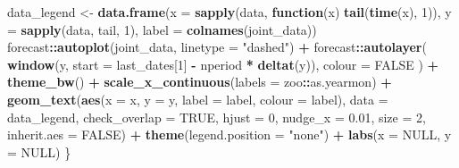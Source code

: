 \documentclass[
  12pt,
  a4paper,french]{article}
\newenvironment{Shaded}{\begin{snugshade}}{\end{snugshade}}
\newcommand{\AttributeTok}[1]{\textcolor[rgb]{0.13,0.29,0.53}{#1}}
\newcommand{\ConstantTok}[1]{\textcolor[rgb]{0.56,0.35,0.01}{#1}}
\newcommand{\ControlFlowTok}[1]{\textcolor[rgb]{0.13,0.29,0.53}{\textbf{#1}}}
\newcommand{\DecValTok}[1]{\textcolor[rgb]{0.00,0.00,0.81}{#1}}
\newcommand{\FloatTok}[1]{\textcolor[rgb]{0.00,0.00,0.81}{#1}}
\newcommand{\FunctionTok}[1]{\textcolor[rgb]{0.13,0.29,0.53}{\textbf{#1}}}
\newcommand{\NormalTok}[1]{#1}
\newcommand{\OtherTok}[1]{\textcolor[rgb]{0.56,0.35,0.01}{#1}}
\newcommand{\SpecialCharTok}[1]{\textcolor[rgb]{0.81,0.36,0.00}{\textbf{#1}}}
\newcommand{\StringTok}[1]{\textcolor[rgb]{0.31,0.60,0.02}{#1}}
\newcommand\1{\mathds{1}}
\begin{document}
\begin{Shaded}
\begin{Highlighting}[]
\NormalTok{  data\_legend }\OtherTok{\textless{}{-}} 
    \FunctionTok{data.frame}\NormalTok{(}\AttributeTok{x =} \FunctionTok{sapply}\NormalTok{(data, }\ControlFlowTok{function}\NormalTok{(x) }\FunctionTok{tail}\NormalTok{(}\FunctionTok{time}\NormalTok{(x), }\DecValTok{1}\NormalTok{)),}
               \AttributeTok{y =} \FunctionTok{sapply}\NormalTok{(data, tail, }\DecValTok{1}\NormalTok{),}
               \AttributeTok{label =} \FunctionTok{colnames}\NormalTok{(joint\_data))}
\NormalTok{  forecast}\SpecialCharTok{::}\FunctionTok{autoplot}\NormalTok{(joint\_data, }\AttributeTok{linetype =} \StringTok{"dashed"}\NormalTok{) }\SpecialCharTok{+} 
\NormalTok{    forecast}\SpecialCharTok{::}\FunctionTok{autolayer}\NormalTok{(}
      \FunctionTok{window}\NormalTok{(y, }\AttributeTok{start =}\NormalTok{ last\_dates[}\DecValTok{1}\NormalTok{] }\SpecialCharTok{{-}}\NormalTok{ nperiod }\SpecialCharTok{*} \FunctionTok{deltat}\NormalTok{(y)),}
      \AttributeTok{colour =} \ConstantTok{FALSE}
\NormalTok{    ) }\SpecialCharTok{+}
    \FunctionTok{theme\_bw}\NormalTok{() }\SpecialCharTok{+}
    \FunctionTok{scale\_x\_continuous}\NormalTok{(}\AttributeTok{labels =}\NormalTok{ zoo}\SpecialCharTok{::}\NormalTok{as.yearmon) }\SpecialCharTok{+}
    \FunctionTok{geom\_text}\NormalTok{(}\FunctionTok{aes}\NormalTok{(}\AttributeTok{x =}\NormalTok{ x, }\AttributeTok{y =}\NormalTok{ y, }\AttributeTok{label =}\NormalTok{ label, }\AttributeTok{colour =}\NormalTok{ label),}
              \AttributeTok{data =}\NormalTok{ data\_legend,}
              \AttributeTok{check\_overlap =} \ConstantTok{TRUE}\NormalTok{, }\AttributeTok{hjust =} \DecValTok{0}\NormalTok{, }\AttributeTok{nudge\_x =} \FloatTok{0.01}\NormalTok{,}
              \AttributeTok{size =} \DecValTok{2}\NormalTok{, }\AttributeTok{inherit.aes =} \ConstantTok{FALSE}\NormalTok{) }\SpecialCharTok{+}
    \FunctionTok{theme}\NormalTok{(}\AttributeTok{legend.position =} \StringTok{"none"}\NormalTok{) }\SpecialCharTok{+}
    \FunctionTok{labs}\NormalTok{(}\AttributeTok{x =} \ConstantTok{NULL}\NormalTok{, }\AttributeTok{y =} \ConstantTok{NULL}\NormalTok{)}
\NormalTok{\}}


\end{Highlighting}
\end{Shaded}
\end{document}
